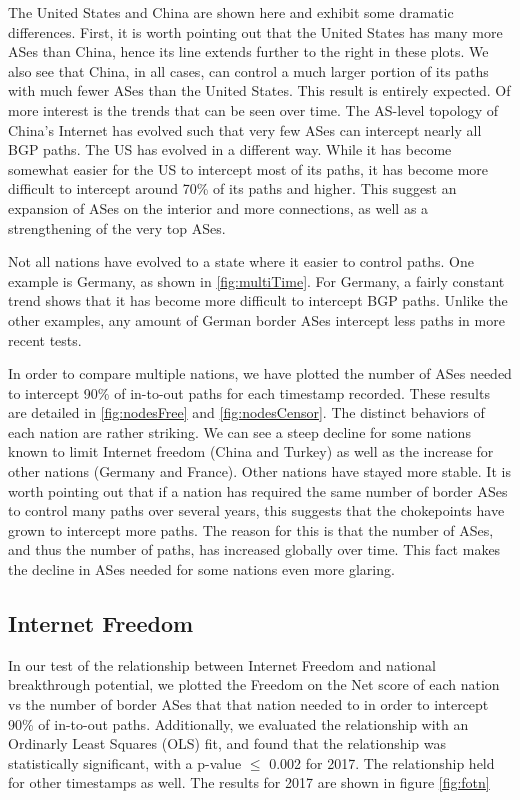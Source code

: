 The United States and China are shown here and exhibit some dramatic
differences. First, it is worth pointing out that the United States has many
more ASes than China, hence its line extends further to the right in these
plots. We also see that China, in all cases, can control a much larger portion
of its paths with much fewer ASes than the United States. This result is
entirely expected. Of more interest is the trends that can be seen over time.
The AS-level topology of China's Internet has evolved such that very few ASes
can intercept nearly all BGP paths. The US has evolved in a different way.
While it has become somewhat easier for the US to intercept most of its paths,
it has become more difficult to intercept around 70\% of its paths and higher.
This suggest an expansion of ASes on the interior and more connections, as well
as a strengthening of the very top ASes.

Not all nations have evolved to a state where it easier to control paths. One
example is Germany, as shown in \figurename \ref{fig:multiTime}. For Germany, a
fairly constant trend shows that it has become more difficult to intercept BGP
paths. Unlike the other examples, any amount of German border ASes intercept
less paths in more recent tests.

In order to compare multiple nations, we have plotted the number of ASes needed
to intercept 90\% of in-to-out paths for each timestamp recorded. These results
are detailed in \figurename \ref{fig:nodesFree} and \figurename
\ref{fig:nodesCensor}.  The distinct behaviors of each nation are rather
striking. We can see a steep decline for some nations known to limit Internet
freedom (China and Turkey) as well as the increase for other nations (Germany
and France). Other nations have stayed more stable. It is worth pointing out
that if a nation has required the same number of border ASes to control many
paths over several years, this suggests that the chokepoints have grown to
intercept more paths. The reason for this is that the number of ASes, and thus
the number of paths, has increased globally over time. This fact makes the
decline in ASes needed for some nations even more glaring.


\subsection{Internet Freedom}

In our test of the relationship between Internet Freedom and national
breakthrough potential, we plotted the Freedom on the Net score of each nation
vs the number of border ASes that that nation needed to in order to intercept
90\% of in-to-out paths. Additionally, we evaluated the relationship with an
Ordinarly Least Squares (OLS) fit, and found that the relationship was
statistically significant, with a p-value $\leq$ 0.002 for 2017. The
relationship held for other timestamps as well. The results for 2017 are shown
in figure \ref{fig:fotn}

